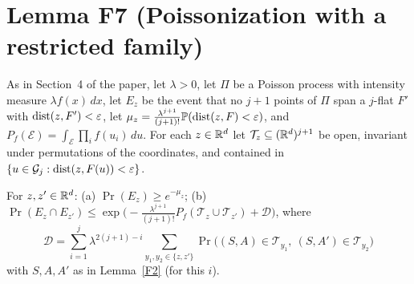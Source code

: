 \documentclass[11pt]{article}
\begin{document}
\section*{Lemma F7 (Poissonization with a restricted family)}

As in Section~4 of the paper, let $\lambda>0$, let $\Pi$ be a Poisson process with intensity measure $\lambda f(x)\,dx$, let $E_z$
be the event that no $j+1$ points of $\Pi$ span a $j$-flat $F'$ with $\operatorname{dist}(z,F')<\varepsilon$, let
$\mu_z=\frac{\lambda^{j+1}}{(j+1)!}\mathbb{P}(\operatorname{dist}(z,F)<\varepsilon)$, and $P_f(\mathcal E)=\int_{\mathcal E}\prod_if(u_i)\,du$. For each $z\in\mathbb{R}^d$ let
$\mathcal T_z\subseteq(\mathbb{R}^d)^{j+1}$ be open, invariant under permutations of the coordinates, and contained in
$\{u\in\mathcal G_j:\operatorname{dist}(z,F(u))<\varepsilon\}$.

\begin{lemma}\label{F7}
For $z,z'\in\mathbb{R}^d$: (a) $\Pr(E_z)\ge e^{-\mu_z}$; (b)
$\Pr(E_z\cap E_{z'})\le\exp\bigl(-\frac{\lambda^{j+1}}{(j+1)!}P_f(\mathcal T_z\cup\mathcal T_{z'})+\mathcal D\bigr)$, where
\[
  \mathcal D=\sum_{i=1}^{j}\lambda^{2(j+1)-i}\sum_{y_1,y_2\in\{z,z'\}}\Pr\bigl((S,A)\in\mathcal T_{y_1},\ (S,A')\in\mathcal T_{y_2}\bigr)
\]
with $S,A,A'$ as in Lemma~\ref{F2} (for this $i$).
\end{lemma}
\end{document}
